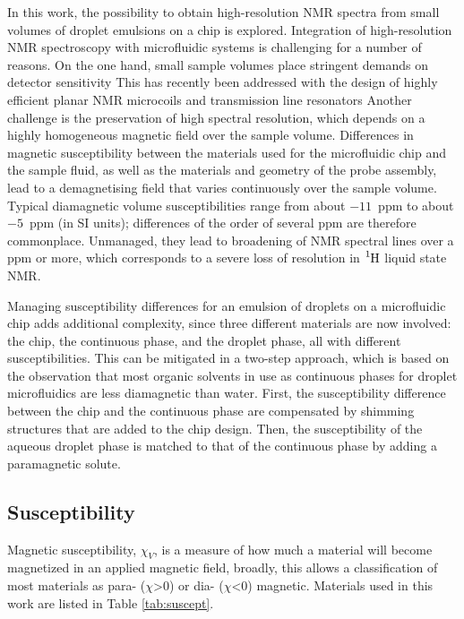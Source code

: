 In this work, the possibility to obtain high-resolution NMR spectra from
small volumes of droplet emulsions on a chip is explored.
Integration of high-resolution NMR spectroscopy with microfluidic systems is
challenging for a number of reasons.
On the one hand, small sample volumes place stringent demands on detector
sensitivity \citep{Badilita:2011td,Zalesskiy:2014hi}
This has recently been addressed with the design of
highly efficient planar NMR microcoils \citep{Spengler:2016km} and
transmission line resonators \citep{Finch:2016gv}
Another challenge is the preservation of high spectral
resolution, which depends on a highly homogeneous magnetic field
over the sample volume. Differences in magnetic susceptibility
between the materials used for the microfluidic chip
and the sample fluid, as well as the materials and geometry
of the probe assembly, lead to a demagnetising field
that varies continuously over the sample volume. Typical diamagnetic
volume susceptibilities range from about
$-11$~ppm to about $-5$~ppm (in SI units); \citep{Kuchel:2003ip,Durrant:2003kv}
differences of the order of several ppm are therefore commonplace.
Unmanaged, they lead to
broadening of NMR spectral lines over a ppm or more, which
corresponds to a severe loss of resolution in $\ce{^1H}$ liquid
state NMR.

Managing susceptibility differences for an emulsion of droplets on a
microfluidic chip adds additional complexity, since three different materials
are now involved: the chip, the continuous phase, and the droplet phase,
all with different susceptibilities.
This can be mitigated in a two-step approach,
which is based on the observation that most organic solvents in use
as continuous phases for droplet microfluidics are less diamagnetic than
water.
First, the susceptibility difference between the chip and the continuous phase
are compensated by shimming structures that are added to the
chip design. Then, the susceptibility of the aqueous droplet phase is matched
to that of the continuous phase by adding a paramagnetic solute.

\subsection{Susceptibility}

Magnetic susceptibility, $\chi_V$, is a measure of how much a material will become magnetized in an
applied magnetic field, broadly, this allows a classification of most materials as para- ($\chi$>0)
or dia- ($\chi$<0) magnetic. Materials used in this work are listed in Table \ref{tab:suscept}.

